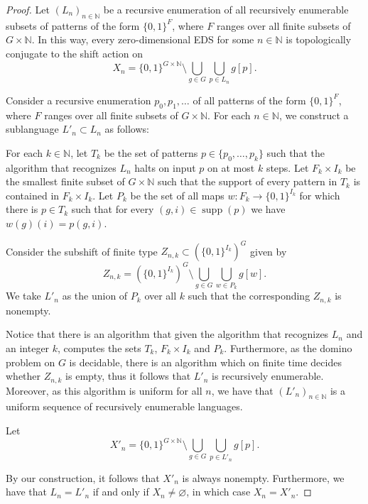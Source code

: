 \documentclass{article}
\theoremstyle{definition}
\theoremstyle{plain}
\newcommand{\NN}{\mathbb{N}}
\begin{document}
\begin{proof}

    Let $(L_n)_{n \in \NN}$ be a recursive enumeration of all recursively enumerable subsets of patterns of the form $\{0,1\}^F$, where $F$ ranges over all finite subsets of $G \times \NN$. In this way, every zero-dimensional EDS for some $n \in \NN$ is topologically conjugate to the shift action on \[ X_n = \{0,1\}^{G\times \NN}\setminus \bigcup_{g \in G}\bigcup_{p \in L_n}g[p].   \]
    

    Consider a recursive enumeration $p_0,p_1,\dots$ of all patterns of the form $\{0,1\}^F$, where $F$ ranges over all finite subsets of $G \times \NN$. For each $n \in \NN$, we construct a sublanguage $L'_n \subset L_n$ as follows:

    For each $k \in \NN$, let $T_k$ be the set of patterns $p\in \{p_0,\dots,p_k\}$ such that the algorithm that recognizes $L_n$ halts on input $p$ on at most $k$ steps. Let $F_k\times I_k$ be the smallest finite subset of $G\times \NN$ such that the support of every pattern in $T_k$ is contained in $F_k\times I_k$. Let $P_k$ be the set of all maps $w\colon F_k \to \{0,1\}^{I_k}$ for which there is $p \in T_k$ such that for every $(g,i)\in \operatorname{supp}(p)$ we have $w(g)(i)=p(g,i)$.

    Consider the subshift of finite type $Z_{n,k} \subset (\{0,1\}^{I_k})^G$ given by \[ Z_{n,k} = (\{0,1\}^{I_k})^G\setminus \bigcup_{g \in G}\bigcup_{w \in P_k}g[w].  \]
    We take $L'_n$ as the union of $P_k$ over all $k$ such that the corresponding $Z_{n,k}$ is nonempty.

    Notice that there is an algorithm that given the algorithm that recognizes $L_n$ and an integer $k$, computes the sets $T_k$, $F_k \times I_k$ and $P_k$. Furthermore, as the domino problem on $G$ is decidable, there is an algorithm which on finite time decides whether $Z_{n,k}$ is empty, thus it follows that $L'_n$ is recursively enumerable. Moreover, as this algorithm is uniform for all $n$, we have that $(L'_n)_{n \in \NN}$ is a uniform sequence of recursively enumerable languages.
    
    Let \[ X'_n = \{0,1\}^{G\times \NN}\setminus \bigcup_{g \in G}\bigcup_{p \in L'_n}g[p].   \]

    By our construction, it follows that $X'_n$ is always nonempty. Furthermore, we have that $L_n = L'_n$ if and only if $X_n \neq \varnothing$, in which case $X_n = X'_n$.


\end{proof}
\end{document}
